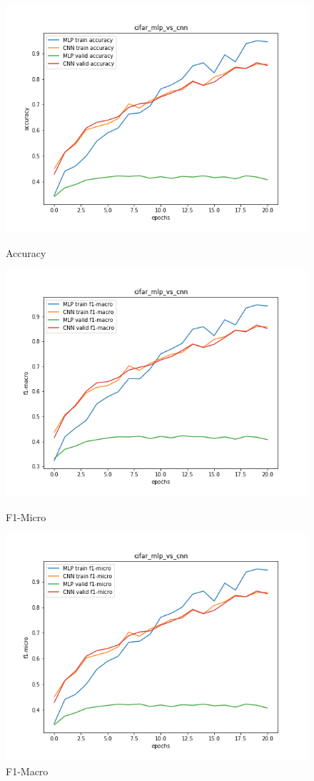 \documentclass{article}
\begin{document}
\begin{figure}[!htb]
	\includegraphics[width=\linewidth]{../output_plots/CIFAR/task-7/cifar-mlp-vs-cnn-Accuracy-accuracy.png}
	\caption{Accuracy}\label{fig:part_2_task_7_accuracy}
	\endminipage\hfill
	\includegraphics[width=\linewidth]{../output_plots/CIFAR/task-7/cifar-mlp-vs-cnn-F1-Macro-score-f1-macro.png}
	\caption{F1-Micro}\label{fig:part_2_task_7_f1-micro}
	\endminipage
	\includegraphics[width=\linewidth]{../output_plots/CIFAR/task-7/cifar-mlp-vs-cnn-F1-Micro-score-f1-micro.png}
	\caption{F1-Macro}\label{fig:part_2_task_7_f1-macro}
	\endminipage
\end{figure}
\end{document}
